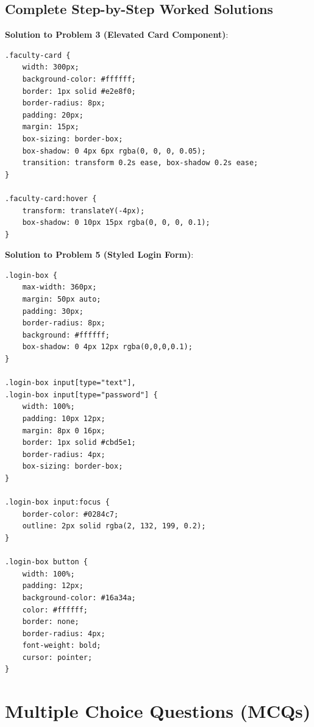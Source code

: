 \subsection{Complete Step-by-Step Worked Solutions}

\begin{solutionbox}
\noindent\textbf{Solution to Problem 3 (Elevated Card Component)}:
\begin{lstlisting}[language=CSS3]
.faculty-card {
    width: 300px;
    background-color: #ffffff;
    border: 1px solid #e2e8f0;
    border-radius: 8px;
    padding: 20px;
    margin: 15px;
    box-sizing: border-box;
    box-shadow: 0 4px 6px rgba(0, 0, 0, 0.05);
    transition: transform 0.2s ease, box-shadow 0.2s ease;
}

.faculty-card:hover {
    transform: translateY(-4px);
    box-shadow: 0 10px 15px rgba(0, 0, 0, 0.1);
}
\end{lstlisting}

\noindent\textbf{Solution to Problem 5 (Styled Login Form)}:
\begin{lstlisting}[language=CSS3]
.login-box {
    max-width: 360px;
    margin: 50px auto;
    padding: 30px;
    border-radius: 8px;
    background: #ffffff;
    box-shadow: 0 4px 12px rgba(0,0,0,0.1);
}

.login-box input[type="text"],
.login-box input[type="password"] {
    width: 100%;
    padding: 10px 12px;
    margin: 8px 0 16px;
    border: 1px solid #cbd5e1;
    border-radius: 4px;
    box-sizing: border-box;
}

.login-box input:focus {
    border-color: #0284c7;
    outline: 2px solid rgba(2, 132, 199, 0.2);
}

.login-box button {
    width: 100%;
    padding: 12px;
    background-color: #16a34a;
    color: #ffffff;
    border: none;
    border-radius: 4px;
    font-weight: bold;
    cursor: pointer;
}
\end{lstlisting}
\end{solutionbox}

\section{Multiple Choice Questions (MCQs)}

